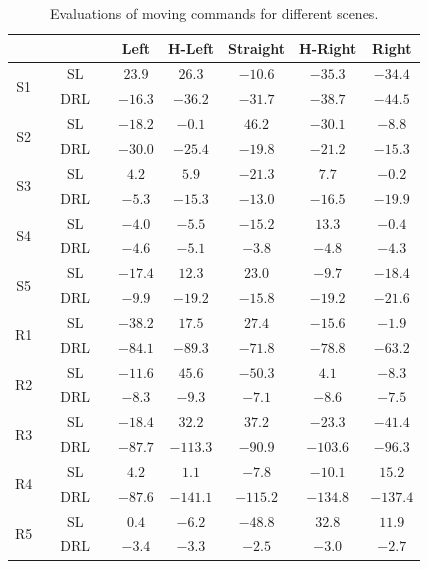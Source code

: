 \begin{table}[!ht]
    \centering
    \caption{Evaluations of moving commands for different scenes.}
    \label{tab:table_score}
    \begin{tabular}{ c c c c c c c c c}
    \hline
    \hline
      & & & & Left & H-Left & Straight & H-Right & Right \\
    \hline
     \multirow{2}{*}{S1} & & SL&  &$ 23.9 $ &$ \mathbf{26.3} $ &$ -10.6 $ &$ -35.3 $ &$ -34.4 $ \\
          &  &DRL& &$ \mathbf{-16.3} $ &$ -36.2 $ &$ -31.7 $ &$ -38.7 $ &$ -44.5 $ \\
    \hline
     \multirow{2}{*}{S2} & & SL &  &$ -18.2 $ &$ \mathbf{-0.1} $ &$ 46.2 $ &$ -30.1 $ &$ -8.8 $ \\
                 & &DRL& &$ -30.0 $ &$ -25.4 $ &$ -19.8 $ &$ -21.2 $ &$ \mathbf{-15.3} $\\
       \hline
    \multirow{2}{*}{S3} &  &SL&  &$ 4.2 $ &$ 5.9 $ &$ -21.3 $ &$ \mathbf{7.7} $ &$ -0.2 $ \\
                & &DRL& &$ \mathbf{-5.3} $ &$ -15.3 $ &$ -13.0 $ &$ -16.5 $ &$ -19.9 $ \\
       \hline
         \multirow{2}{*}{S4} & &SL&  &$ -4.0 $ &$ -5.5 $ &$ -15.2 $ &$ \mathbf{13.3} $ &$ -0.4 $ \\
                & &DRL& &$ -4.6 $ &$ -5.1 $ &$ \mathbf{-3.8} $ &$ -4.8 $ &$ -4.3 $ \\
     \hline
     \multirow{2}{*}{S5} & &SL&  &$ -17.4 $ &$ 12.3 $ &$ \mathbf{23.0} $ &$ -9.7 $ &$ -18.4 $ \\
            & &DRL& &$ \mathbf{-9.9} $ &$ -19.2 $ &$ -15.8 $ &$ -19.2 $ &$ -21.6 $ \\
    \hline
       \hline
     \multirow{2}{*}{R1} & &SL&  &$ -38.2 $ &$ 17.5 $ &$ \mathbf{27.4} $ &$ -15.6 $ &$ -1.9 $ \\
            & &DRL& &$ -84.1 $ &$ -89.3 $ &$ -71.8 $ &$ -78.8 $ &$ \mathbf{-63.2} $ \\
    \hline
     \multirow{2}{*}{R2} & &SL&  &$ -11.6 $ &$ \mathbf{45.6} $ &$ -50.3 $ &$ 4.1 $ &$ -8.3 $ \\
        & &DRL& &$ -8.3 $ &$ -9.3 $ &$ \mathbf{-7.1} $ &$ -8.6 $ &$ -7.5 $ \\
    \hline
     \multirow{2}{*}{R3} & & SL& &$ -18.4 $ &$ 32.2 $ &$ \mathbf{37.2} $ &$ -23.3 $ &$ -41.4 $ \\
        & &DRL& &$ \mathbf{-87.7} $ &$ -113.3 $ &$ -90.9 $ &$ -103.6 $ &$ -96.3 $ \\
       \hline
         \multirow{2}{*}{R4} & &SL& &$ 4.2 $ &$ 1.1 $ &$ -7.8 $ &$ -10.1 $ &$ \mathbf{15.2} $ \\
        & &DRL& &$ \mathbf{-87.6} $ &$ -141.1 $ &$ -115.2 $ &$ -134.8 $ &$ -137.4 $ \\
       \hline
         \multirow{2}{*}{R5}& &SL&  &$ 0.4 $ &$ -6.2 $ &$ -48.8 $ &$ \mathbf{32.8} $ &$ 11.9 $ \\
        & &DRL&    &$ -3.4 $ &$ -3.3 $ &$ \mathbf{-2.5} $ &$ -3.0 $ &$ -2.7 $ \\
    \hline
    \end{tabular}
\end{table}


